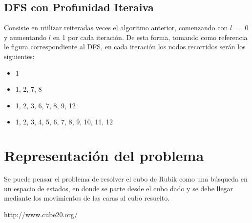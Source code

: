 \documentclass[11pt,a4paper]{article}
\begin{document}
\subsection{DFS con Profunidad Iteraiva}
Consiste en utilizar reiteradas veces el algoritmo anterior, comenzando con $l \; = \; 0$ y aumentando $l$ en 1 por cada iteración.
De esta forma, tomando como referencia le figura correspondiente al DFS, en cada iteración los nodos recorridos serán los siguientes: 
\begin{itemize}
\item 1
\item 1, 2, 7, 8
\item 1, 2, 3, 6, 7, 8, 9, 12 
\item 1, 2, 3, 4, 5, 6, 7, 8, 9, 10, 11, 12
\end{itemize}  




\section{Representación del problema}

Se puede pensar el problema de resolver el cubo de Rubik como una búsqueda en un espacio de estados, en donde se parte desde el cubo dado y se debe llegar mediante los movimientos de las caras al cubo resuelto. 





\begin{thebibliography}{9}

  http://www.cube20.org/
  
\end{thebibliography}
\end{document}
